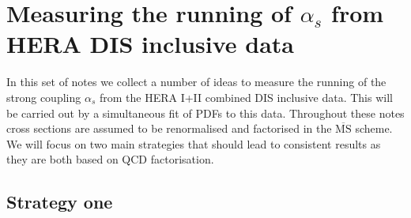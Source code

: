 \documentclass[10pt,a4paper]{article}
\begin{document}
\section{Measuring the running of $\alpha_s$ from HERA DIS inclusive
  data}

In this set of notes we collect a number of ideas to measure the
running of the strong coupling $\alpha_s$ from the HERA I+II combined
DIS inclusive data. This will be carried out by a simultaneous fit of
PDFs to this data. Throughout these notes cross sections are assumed
to be renormalised and factorised in the $\overline{\mbox{MS}}$
scheme. We will focus on two main strategies that should lead to
consistent results as they are both based on QCD factorisation.

\subsection{Strategy one}
\end{document}
